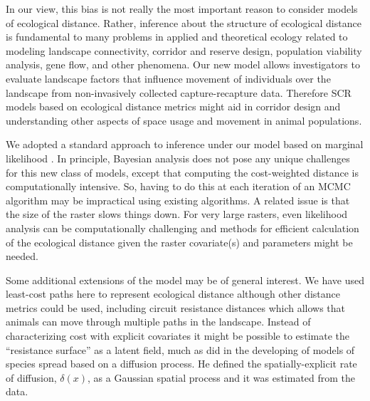 \documentclass[12pt]{article}
\begin{document}
\begin{spacing}{1.8}
In our view, this bias is not really the most important reason to
consider models of ecological distance. Rather, inference about the
structure of ecological distance is fundamental to many problems in
applied and theoretical ecology related to modeling landscape
connectivity, corridor and reserve design, population viability
analysis, gene flow, and other phenomena.  Our new model allows
investigators to evaluate landscape factors that influence movement of
individuals over the landscape from non-invasively collected
capture-recapture data.  Therefore SCR models based on ecological
distance metrics might aid in corridor design and understanding other
aspects of space usage and movement in animal populations.

We adopted a standard approach to inference under our model based on
marginal likelihood \citep{borchers_efford:2008}. In principle,
Bayesian analysis does not pose any unique challenges for this new
class of models, except that computing the cost-weighted distance is
computationally intensive.  So, having to do this at each iteration of
an MCMC algorithm may be impractical using existing algorithms.  A
related issue is that the size of the raster slows things down. For
very large rasters, even likelihood analysis can be computationally
challenging and methods for efficient calculation of the ecological
distance given the raster covariate(s) and parameters might be needed.


Some additional extensions of the model may be of general interest.
We have used least-cost paths here to represent ecological distance
although other distance metrics could be used, including circuit
resistance distances \citep{mcrae:2006} which allows that animals can
move through multiple paths in the landscape.  Instead of
characterizing cost with explicit covariates it might be possible to
estimate the ``resistance surface'' as a latent field, much as
\citep{wikle:2003} did in the developing of models of species spread
based on a diffusion process. He defined the spatially-explicit rate
of diffusion, $\delta(x)$, as a Gaussian spatial process and it was
estimated from the data.












\end{spacing}

\newpage



\end{document}
